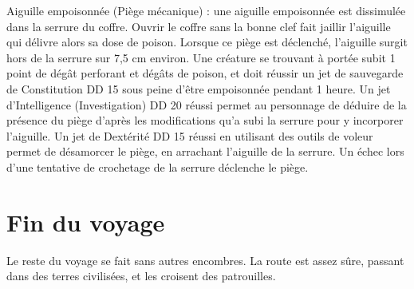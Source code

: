 \documentclass[a4paper,10pt,openany]{book}
\begin{document}
\begin{multicols}{2}
\begin{quotebox}
	Aiguille empoisonnée (Piège mécanique) : une aiguille empoisonnée est dissimulée dans la serrure du coffre. Ouvrir le coffre sans la bonne clef fait
	jaillir l’aiguille qui délivre alors sa dose de poison. Lorsque ce piège est déclenché, l’aiguille surgit hors de la serrure sur 7,5 cm environ. Une
	créature se trouvant à portée subit 1 point de dégât perforant et  dégâts de poison, et doit réussir un jet de sauvegarde de Constitution
	DD 15 sous peine d’être empoisonnée pendant 1 heure. Un jet d’Intelligence (Investigation) DD 20 réussi permet au personnage de déduire de la
	présence du piège d’après les modifications qu’a subi la serrure pour y incorporer l’aiguille. Un jet de Dextérité DD 15 réussi en utilisant des
	outils de voleur permet de désamorcer le piège, en arrachant l’aiguille de la serrure. Un échec lors d’une tentative de crochetage de la serrure
	déclenche le piège.
\end{quotebox}

\section{Fin du voyage}
Le reste du voyage se fait sans autres encombres. La route est assez sûre, passant dans des terres civilisées, et les \PJs croisent des patrouilles.


\end{multicols}
\end{document}

